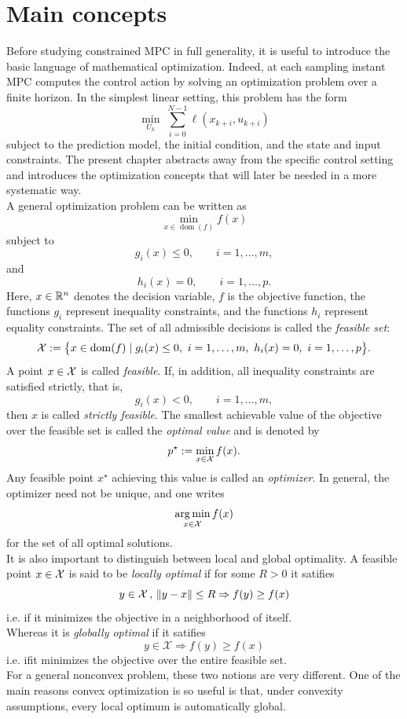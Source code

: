 \section{Main concepts}

Before studying constrained MPC in full generality, it is useful to introduce the basic language of mathematical optimization. Indeed, at each sampling instant MPC computes the control action by solving an optimization problem over a finite horizon. In the simplest linear setting, this problem has the form
\[
\min_{U_k}\;\sum_{i=0}^{N-1}\ell(x_{k+i},u_{k+i})
\]
subject to the prediction model, the initial condition, and the state and input constraints. The present chapter abstracts away from the specific control setting and introduces the optimization concepts that will later be needed in a more systematic way.\\
A general optimization problem can be written as
\[
\min_{x \in \operatorname{dom}(f)} f(x)
\]
subject to
\[
g_i(x)\le 0,\qquad i=1,\dots,m,
\]
and
\[
h_i(x)=0,\qquad i=1,\dots,p.
\]
Here, \(x\in\mathbb{R}^n\) denotes the decision variable, \(f\) is the objective function, the functions \(g_i\) represent inequality constraints, and the functions \(h_i\) represent equality constraints. The set of all admissible decisions is called the \emph{feasible set}:
\[
\cX := \bigl\{x\in \operatorname{dom}(f)\mid g_i(x)\le 0,\ i=1,\dots,m,\ h_i(x)=0,\ i=1,\dots,p\bigr\}.
\]
A point \(x\in\mathcal{X}\) is called \emph{feasible}. If, in addition, all inequality constraints are satisfied strictly, that is,
\[
g_i(x)<0,\qquad i=1,\dots,m,
\]
then \(x\) is called \emph{strictly feasible}. The smallest achievable value of the objective over the feasible set is called the \emph{optimal value} and is denoted by
\[
p^\star := \min_{x\in \mathcal{X}} f(x).
\]
Any feasible point \(x^\star\) achieving this value is called an \emph{optimizer}. In general, the optimizer need not be unique, and one writes
\[
\operatorname*{arg\,min}_{x\in \mathcal{X}} f(x)
\]
for the set of all optimal solutions.\\

It is also important to distinguish between local and global optimality. A feasible point \(x\in\mathcal{X}\) is said to be \emph{locally optimal} if for some $R>0$ it satifies
$$y \in \mathcal{X} \, , \, \left\lVert y-x \right\rVert \leq R \Rightarrow f(y) \geq f(x) $$
i.e. if it minimizes the objective in a neighborhood of itself. \\
Whereas it is \emph{globally optimal} if it satifies
$$y \in \mathcal{X} \Rightarrow f(y) \geq f(x) $$
i.e. ifit minimizes the objective over the entire feasible set.\\
For a general nonconvex problem, these two notions are very different. One of the main reasons convex optimization is so useful is that, under convexity assumptions, every local optimum is automatically global.\\

